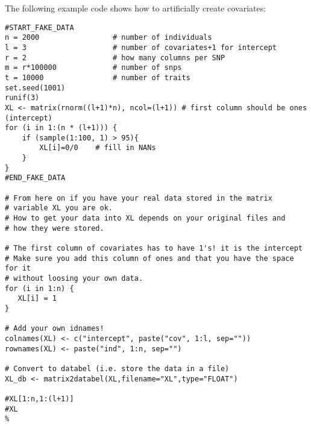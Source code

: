\documentclass{report}
\begin{document}
The following example code shows how to artificially create covariates:
\begin{lstlisting}[escapechar=\%]
#START_FAKE_DATA
n = 2000                 # number of individuals
l = 3                    # number of covariates+1 for intercept
r = 2                    # how many columns per SNP
m = r*100000             # number of snps
t = 10000                # number of traits
set.seed(1001)
runif(3)
XL <- matrix(rnorm((l+1)*n), ncol=(l+1)) # first column should be ones (intercept)
for (i in 1:(n * (l+1))) {
    if (sample(1:100, 1) > 95){
        XL[i]=0/0    # fill in NANs
    }
}
#END_FAKE_DATA

# From here on if you have your real data stored in the matrix
# variable XL you are ok.
# How to get your data into XL depends on your original files and
# how they were stored.

# The first column of covariates has to have 1's! it is the intercept
# Make sure you add this column of ones and that you have the space for it
# without loosing your own data.
for (i in 1:n) {
   XL[i] = 1
}

# Add your own idnames!
colnames(XL) <- c("intercept", paste("cov", 1:l, sep=""))
rownames(XL) <- paste("ind", 1:n, sep="")

# Convert to databel (i.e. store the data in a file)
XL_db <- matrix2databel(XL,filename="XL",type="FLOAT")

#XL[1:n,1:(l+1)]
#XL
%
\end{lstlisting}
\end{document}
